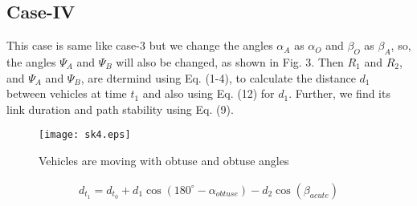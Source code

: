 \documentclass[journal]{IEEEtran}
\begin{document}
\subsection{Case-IV}
This case is same like case-3 but we change the angles $\alpha_{A}$ as $\alpha_{O}$ and $\beta_{O}$ as $\beta_{A}$, so, the angles $\Psi_A$ and $\Psi_B$ will also be changed, as shown in Fig. 3. Then $R_1$ and $R_2$, and $\Psi_A$ and $\Psi_B$, are dtermind using Eq. (1-4), to calculate the distance $d_1$ between vehicles at time $t_1$ and also using Eq. (12) for $d_1$. Further, we find its link duration and path stability using Eq. (9).

\begin{figure}[h]
  \centering
  {\texttt{[image: sk4.eps]}}
  \caption{Vehicles are moving with obtuse and obtuse angles}
\end{figure}
\begin{eqnarray}
d_{t_1} =  d_{t_0}+d_{1}\cos{(180^{\circ}-\alpha_{obtuse})}-d_{2}\cos{(\beta_{acute})}
\end{eqnarray}
\end{document}
